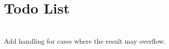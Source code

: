 \chapter{Todo List }
\hypertarget{todo}{}\label{todo}

\begin{DoxyRefList}
\item[{\parbox[t]{\linewidth}{Member \doxylink{class_calculation_engine_a4fbe0da5b956e1aec668ca2961eeb4f5}{Calculation\+Engine::power} (double base, double exponent) const}}]\hfill \\
\label{todo__todo000001}%
%
Add handling for cases where the result may overflow. 
\end{DoxyRefList}